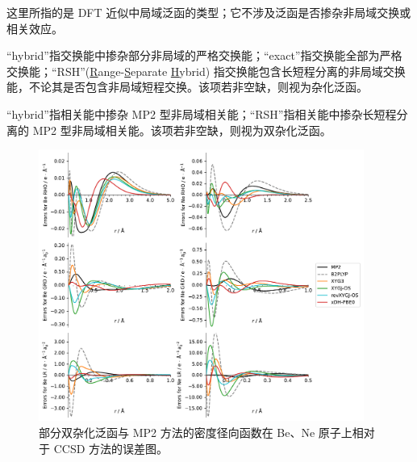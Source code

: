 \begin{landscape}
\small
\vspace{-1em}
\par\noindent{} 这里所指的是 DFT 近似中局域泛函的类型；它不涉及泛函是否掺杂非局域交换或相关效应。
\par\noindent{} “hybrid”指交换能中掺杂部分非局域的严格交换能；“exact”指交换能全部为严格交换能；“RSH”(\underline{R}ange-\underline{S}eparate \underline{H}ybrid) 指交换能包含长短程分离的非局域交换能，不论其是否包含非局域短程交换。该项若非空缺，则视为杂化泛函。
\par\noindent{} “hybrid”指相关能中掺杂 MP2 型非局域相关能；“RSH”指相关能中掺杂长短程分离的 MP2 型非局域相关能。该项若非空缺，则视为双杂化泛函。
\end{landscape}

\newpage

\begin{figure}[hp]
    \centering
    \caption{部分双杂化泛函与 MP2 方法的密度径向函数在 Be、Ne 原子上相对于 CCSD 方法的误差图。}
    \label{fig.supp-fig-s1}
    \includegraphics[width=0.95\textwidth]{assets/supp-fig-s1.pdf}
\end{figure}

\newpage

